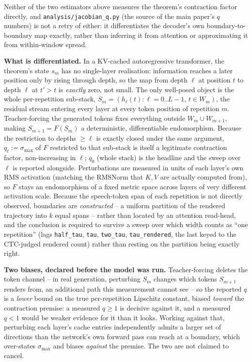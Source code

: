 \documentclass[11pt]{article}
\begin{document}
Neither of the two estimators above measures the theorem's contraction factor
directly, and \texttt{analysis/jacobian\_q.py} (the source of the main paper's
$q$ numbers) is not a retry of either: it differentiates the decoder's
own boundary-to-boundary map exactly, rather than inferring it from attention
or approximating it from within-window spread.

\noindent\textbf{What is differentiated.} In a KV-cached autoregressive
transformer, the theorem's state $s_m$ has no single-layer realisation:
information reaches a later position only by rising through depth, so the map
from depth $\ell$ at position $t$ to depth $\ell$ at $t'>t$ is \emph{exactly}
zero, not small. The only well-posed object is the whole per-repetition
sub-stack, $S_m = (h_\ell(t): \ell=0..L-1,\, t\in W_m)$, the residual stream
entering every layer at every token position of repetition $m$. Teacher-forcing
the generated tokens fixes everything outside $W_m\cup W_{m+1}$, making
$S_{m+1}=F(S_m)$ a deterministic, differentiable endomorphism. Because the
restriction to depths $\ge\ell$ is exactly closed under the same argument,
$q_\ell:=\sigma_{\max}$ of $F$ restricted to that sub-stack is itself a
legitimate contraction factor, non-increasing in $\ell$; $q_0$ (whole stack) is
the headline and the sweep over $\ell$ is reported alongside. Perturbations are
measured in units of each layer's own RMS activation (matching the RMSNorm
that $K,V$ are actually computed from), so $F$ stays an endomorphism of a fixed
metric space across layers of very different activation scale. Because the
speech-token span of each repetition is not directly observed, boundaries are
\emph{constructed} -- a uniform partition of the rendered trajectory into $k$
equal spans -- rather than located by an attention read-head, and the
conclusion is required to survive a sweep over which width counts as ``one
repetition'' (lags \texttt{half\_tau}, \texttt{tau}, \texttt{two\_tau},
\texttt{tau\_rendered}, the last keyed to the CTC-judged rendered count) rather
than resting on the partition being exactly right.

\noindent\textbf{Two biases, declared before the model was run.}
Teacher-forcing deletes the token channel -- in real generation, perturbing
$S_m$ changes which tokens $S_{m+1}$ renders from, an additional path this
measurement cannot see -- so the reported $q$ is a \emph{lower} bound on the
true per-repetition Lipschitz constant, biased \emph{toward} the contraction
premise: a measured $q\ge1$ is decisive against it, and a measured $q<1$ would
be weaker evidence for it than it looks. Working against that, perturbing each
layer's cache entries independently admits a larger set of directions than the
network's own forward pass can reach at a boundary, which over-states
$\sigma_{\max}$ and biases \emph{against} the premise. The two are not claimed
to cancel.
\end{document}
